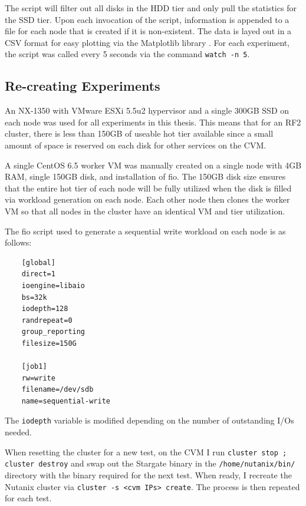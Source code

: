 \documentclass[12pt]{article}
\begin{document}
  The script will filter out all disks in the HDD tier and only pull the
  statistics for the SSD tier. Upon each invocation of the script, information
  is appended to a file for each node that is created if it is non-existent.
  The data is layed out in a CSV format for easy plotting via the Matplotlib
  library \cite{matplotlib}. For each experiment, the script was called every 5
  seconds via the command \texttt{watch -n 5}.

  \subsection{Re-creating Experiments}

  An NX-1350 with VMware ESXi 5.5u2 hypervisor and a single 300GB SSD on each
  node was used for all experiments in this thesis. This means that for an RF2
  cluster, there is less than 150GB of useable hot tier available since a small
  amount of space is reserved on each disk for other services on the CVM.

  A single CentOS 6.5 worker VM was manually created on a single node with 4GB
  RAM, single 150GB disk, and installation of fio. The 150GB disk size ensures
  that the entire hot tier of each node will be fully utilized when the disk is
  filled via workload generation on each node. Each other node then clones the
  worker VM so that all nodes in the cluster have an identical VM and tier
  utilization.

  The fio script used to generate a sequential write workload on each node is
  as follows:
  
  \singlespace
  \begin{tcolorbox}
  \begin{verbatim}
    [global]
    direct=1
    ioengine=libaio
    bs=32k
    iodepth=128
    randrepeat=0
    group_reporting
    filesize=150G

    [job1]
    rw=write
    filename=/dev/sdb
    name=sequential-write
  \end{verbatim}
  \end{tcolorbox}
  \doublespace

  The \texttt{iodepth} variable is modified depending on the number of
  outstanding I/Os needed.

  When resetting the cluster for a new test, on the CVM I run
  \texttt{cluster stop ; cluster destroy} and swap out the Stargate binary in
  the \texttt{/home/nutanix/bin/} directory with the binary required for the
  next test. When ready, I recreate the Nutanix cluster via
  \texttt{cluster -s <cvm IPs> create}. The process is then repeated for each
  test.
\end{document}
